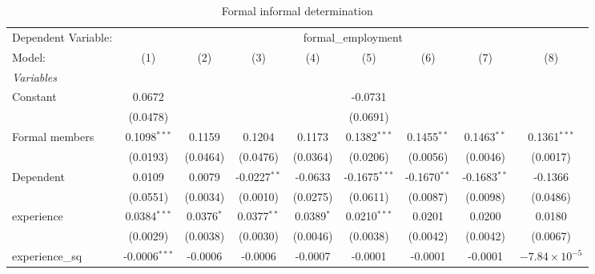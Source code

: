 
\begin{table}[htbp]
   \caption{Formal informal determination}
   \centering
   \begin{tabular}{lcccccccc}
      \tabularnewline \midrule \midrule
      Dependent Variable: & \multicolumn{8}{c}{formal\_employment}\\
      Model:                    & (1)                     & (2)          & (3)            & (4)          & (5)             & (6)                     & (7)                    & (8)\\  
      \midrule
      \emph{Variables}\\
      Constant                  & 0.0672                  &              &                &              & -0.0731         &                         &                        &   \\   
                                & (0.0478)                &              &                &              & (0.0691)        &                         &                        &   \\   
      Formal members            & 0.1098$^{***}$          & 0.1159       & 0.1204         & 0.1173       & 0.1382$^{***}$  & 0.1455$^{**}$           & 0.1463$^{**}$          & 0.1361$^{***}$\\   
                                & (0.0193)                & (0.0464)     & (0.0476)       & (0.0364)     & (0.0206)        & (0.0056)                & (0.0046)               & (0.0017)\\   
      Dependent                 & 0.0109                  & 0.0079       & -0.0227$^{**}$ & -0.0633      & -0.1675$^{***}$ & -0.1670$^{**}$          & -0.1683$^{**}$         & -0.1366\\   
                                & (0.0551)                & (0.0034)     & (0.0010)       & (0.0275)     & (0.0611)        & (0.0087)                & (0.0098)               & (0.0486)\\   
      experience                & 0.0384$^{***}$          & 0.0376$^{*}$ & 0.0377$^{**}$  & 0.0389$^{*}$ & 0.0210$^{***}$  & 0.0201                  & 0.0200                 & 0.0180\\   
                                & (0.0029)                & (0.0038)     & (0.0030)       & (0.0046)     & (0.0038)        & (0.0042)                & (0.0042)               & (0.0067)\\   
      experience\_sq            & -0.0006$^{***}$         & -0.0006      & -0.0006        & -0.0007      & -0.0001         & -0.0001                 & -0.0001                & $-7.84\times 10^{-5}$\\    

\end{tabular}
\end{table}

